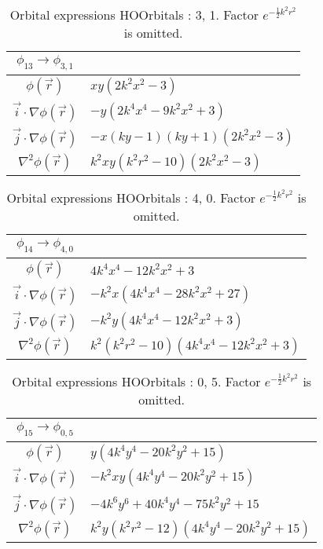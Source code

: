 \begin{table}
\begin{center}
\begin{tabular}{c|l}
$\phi_{13} \rightarrow \phi_{3, 1}$\\
\hline
$\phi(\vec r)$ & $x y \left(2 k^{2} x^{2} -3\right)$\\
\hline
$\vec i\cdot \nabla \phi(\vec r)$ & $- y \left(2 k^{4} x^{4} - 9 k^{2} x^{2} + 3\right)$\\
$\vec j\cdot \nabla \phi(\vec r)$ & $- x \left(k y -1\right) \left(k y + 1\right) \left(2 k^{2} x^{2} -3\right)$\\
\hline
$\nabla^2 \phi(\vec r)$ & $k^{2} x y \left(k^{2} r^{2} -10\right) \left(2 k^{2} x^{2} -3\right)$\\
\end{tabular}
\caption{Orbital expressions HOOrbitals : 3, 1. Factor $e^{- \frac{1}{2} k^{2} r^{2}}$ is omitted.}
\end{center}
\end{table}


\begin{table}
\begin{center}
\begin{tabular}{c|l}
$\phi_{14} \rightarrow \phi_{4, 0}$\\
\hline
$\phi(\vec r)$ & $4 k^{4} x^{4} - 12 k^{2} x^{2} + 3$\\
\hline
$\vec i\cdot \nabla \phi(\vec r)$ & $- k^{2} x \left(4 k^{4} x^{4} - 28 k^{2} x^{2} + 27\right)$\\
$\vec j\cdot \nabla \phi(\vec r)$ & $- k^{2} y \left(4 k^{4} x^{4} - 12 k^{2} x^{2} + 3\right)$\\
\hline
$\nabla^2 \phi(\vec r)$ & $k^{2} \left(k^{2} r^{2} -10\right) \left(4 k^{4} x^{4} - 12 k^{2} x^{2} + 3\right)$\\
\end{tabular}
\caption{Orbital expressions HOOrbitals : 4, 0. Factor $e^{- \frac{1}{2} k^{2} r^{2}}$ is omitted.}
\end{center}
\end{table}

\clearpage

\begin{table}
\begin{center}
\begin{tabular}{c|l}
$\phi_{15} \rightarrow \phi_{0, 5}$\\
\hline
$\phi(\vec r)$ & $y \left(4 k^{4} y^{4} - 20 k^{2} y^{2} + 15\right)$\\
\hline
$\vec i\cdot \nabla \phi(\vec r)$ & $- k^{2} x y \left(4 k^{4} y^{4} - 20 k^{2} y^{2} + 15\right)$\\
$\vec j\cdot \nabla \phi(\vec r)$ & $- 4 k^{6} y^{6} + 40 k^{4} y^{4} - 75 k^{2} y^{2} + 15$\\
\hline
$\nabla^2 \phi(\vec r)$ & $k^{2} y \left(k^{2} r^{2} -12\right) \left(4 k^{4} y^{4} - 20 k^{2} y^{2} + 15\right)$\\
\end{tabular}
\caption{Orbital expressions HOOrbitals : 0, 5. Factor $e^{- \frac{1}{2} k^{2} r^{2}}$ is omitted.}
\end{center}
\end{table}


